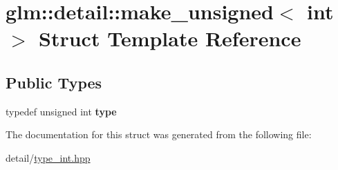 \hypertarget{structglm_1_1detail_1_1make__unsigned_3_01int_01_4}{\section{glm\-:\-:detail\-:\-:make\-\_\-unsigned$<$ int $>$ Struct Template Reference}
\label{structglm_1_1detail_1_1make__unsigned_3_01int_01_4}
}
\subsection*{Public Types}
\begin{DoxyCompactItemize}
\item 
\hypertarget{structglm_1_1detail_1_1make__unsigned_3_01int_01_4_ac3fd57ed35c0305bbe941009a84139c1}{typedef unsigned int {\bfseries type}}\label{structglm_1_1detail_1_1make__unsigned_3_01int_01_4_ac3fd57ed35c0305bbe941009a84139c1}

\end{DoxyCompactItemize}


The documentation for this struct was generated from the following file\-:\begin{DoxyCompactItemize}
\item 
detail/\hyperlink{type__int_8hpp}{type\-\_\-int.\-hpp}\end{DoxyCompactItemize}
